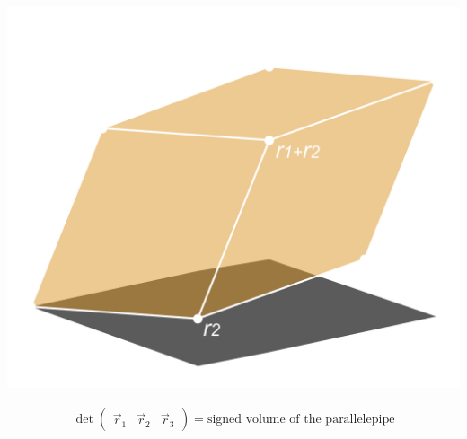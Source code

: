 \documentclass[pdf,9pt]{beamer}
\begin{document}
\begin{frame}[fragile]
\begin{center}
    \includegraphics[scale=0.07]{./figures/Determinant_parallelepiped.png}
\end{center}
\vfill
\begin{align*}
    \det \begin{pmatrix} \vec{r}_1 & \vec{r}_2 & \vec{r}_3    \end{pmatrix}
    = \text{signed volume of the parallelepipe}
\end{align*}
\end{frame}
\end{document}

